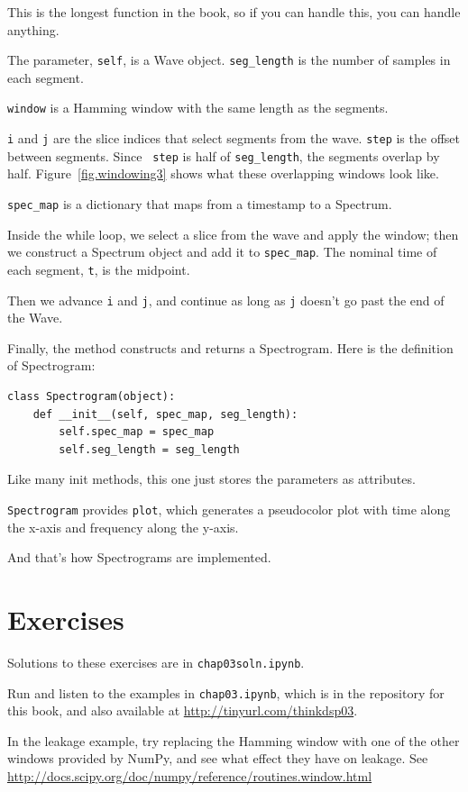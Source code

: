 \documentclass[12pt]{book}
\begin{document}
This is the longest function in the book, so if you can handle
this, you can handle anything.

The parameter, {\tt self}, is a Wave object.
\verb"seg_length" is the number of samples in each segment.

{\tt window} is a Hamming window with the same length as the segments.

{\tt i} and {\tt j} are the slice indices that select segments from
the wave.  {\tt step} is the offset between segments.  Since {\tt
  step} is half of \verb"seg_length", the segments overlap by half.
Figure~\ref{fig.windowing3} shows what these overlapping windows look
like.

\verb"spec_map" is a dictionary that maps from a timestamp to
a Spectrum.

Inside the while loop, we select a slice from the wave and apply
the window; then we construct a Spectrum
object and add it to \verb"spec_map".  The nominal time of
each segment, {\tt t}, is the midpoint.

Then we advance {\tt i} and {\tt j}, and continue as long as {\tt j}
doesn't go past the end of the Wave.

Finally, the method constructs and returns a Spectrogram.  Here
is the definition of Spectrogram:

\begin{verbatim}
class Spectrogram(object):
    def __init__(self, spec_map, seg_length):
        self.spec_map = spec_map
        self.seg_length = seg_length
\end{verbatim}

Like many init methods, this one just stores the
parameters as attributes.

{\tt Spectrogram} provides {\tt plot}, which generates a
pseudocolor plot with time along the x-axis and frequency along
the y-axis.

And that's how Spectrograms are implemented.


\section{Exercises}

Solutions to these exercises are in {\tt chap03soln.ipynb}.

\begin{exercise}
Run and listen to the examples in {\tt chap03.ipynb}, which is
in the repository for this book, and also available at
\url{http://tinyurl.com/thinkdsp03}.

In the leakage example, try replacing the Hamming window with one of
the other windows provided by NumPy, and see what effect they have on
leakage.  See
\url{http://docs.scipy.org/doc/numpy/reference/routines.window.html}
\end{exercise}
\end{document}
